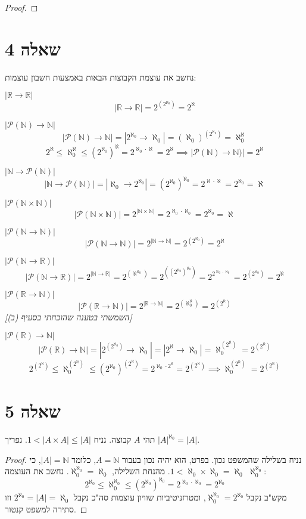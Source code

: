 \documentclass[]{article}
\newcommand\N     {\mathbb{N}}
\newcommand\R     {\mathbb{R}}
\newcommand\ps    {\mathcal{P}}
\newcommand\az    {\aleph_0}
\newcommand\uaz   {^{\aleph_0}}
\newcommand\al    {\aleph}
\newcommand\ual   {^\aleph}
\newcommand\taz   {2^{\aleph_0}}
\newcommand\utaz  { ^{\left (2^{\aleph_0} \right )}}
\newcommand\tal   {2^{\aleph}}
\newcommand\utal  { ^{\left (2^{\aleph} \right )}}
\newcommand\ttaz  {2^{\left (2^{\aleph_0}\right )}}
\begin{document}
\begin{hebenum}[(a)]
\begin{proof}
		\end{proof}
	\end{hebenum}
	\section*{שאלה 4}
	נחשב את עוצמת הקבוצות הבאות באמצעות חשבון עוצמות: 
	\begin{hebenum}[(a)]
		\item $ |\R \to \R| $
		\[ |\R \to \R| = \ttaz = \tal \]
		\item $ |\ps(\N) \to \N| $
		\[ |\ps(\N) \to \N| = |\taz \to \az| = (\az)\utaz = \az^\al \]
		\[ \tal \le \az^\al \le (\taz)^\al = 2^{\az \cdot \al} = 2^\al \implies |\ps(\N) \to \N)| = \tal \]
		\item $ |\N \to \ps(\N)| $
		\[ |\N \to \ps(\N)| = |\az \to \taz| = (\taz)\uaz = 2^{\al \cdot \al} = \taz = \al \]
		\item $ |\ps(\N \times \N)| $
		\[ |\ps(\N \times \N)| = 2^{|\N \times \N|} = 2^{\az \cdot \az} = \taz = \al \]
		\item $ |\ps(\N \to \N)| $
		\[ |\ps(\N \to \N)| = 2^{|\N \to \N|} = \ttaz = \tal \]
		\item $ |\ps(\N \to \R)| $
		\[ |\ps(\N \to \R)| = 2^{|\N \to \R|} = 2^{\left ( \al\uaz \right )} = 2^{\left ((\taz)\uaz \right )} = 2^{2^{\az \cdot \az}} = 2\utaz = 2\ual \]
		\item $ |\ps(\R \to \N)| $
		\[ |\ps(\R \to \N)| = 2^{|\R\to \N|} = 2^{\left (\az^\al \right )} =  2\utal \]
		\textit{[השמשתי בטענה שהוכחתי בסעיף (ב)]}
		\item $ |\ps(\R) \to \N| $
		\[ |\ps(\R) \to \N| = |\ttaz \to \az| = |\tal \to \az| = \az\utal = 2\utal \]
		\[ 2\utal \le \az\utal \le (\taz)\utal = 2^{\az \cdot \tal} = 2\utal \implies \az\utal = 2\utal \]
	\end{hebenum}
	\section*{שאלה 5}
	תהי $ A $ קבוצה. נניח $ 1 < |A \times A| \le |A| $. נפריך $ |A|\uaz = |A| $. 
	\begin{proof}
		נניח בשלילה שהמשפט נכון. בפרט, הוא יהיה נכון בעבור $ A = \N $, כלומר $ |A| = \N $, כי $ 1 < \az \times \az = \az $. מהנחת השלילה, $ \az\uaz = \az $. נחשב את העוצמה $ \az\uaz $: 
		\[ \taz \le \az\uaz \le (\taz)\uaz = 2^{\az \cdot \az} = \taz \]
		מקש"ב נקבל $ \az\uaz = \taz $, ומטרזניטיביות שוויון עוצמות סה"כ נקבל $ \taz = |A| = \az $ וזו סתירה למשפט קנטור. 
	\end{proof}
\end{document}
